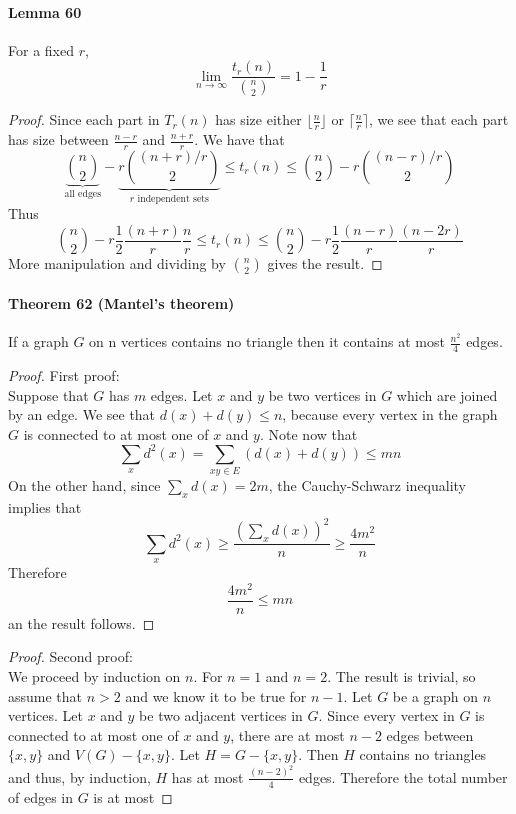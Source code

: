 \paragraph{Lemma 60} For a fixed $ r $, 
$$ \lim_{n\to\infty} \frac{t_r(n)}{\binom{n}{2}} = 1 - \frac{1}{r}$$
\begin{proof}
    Since each part in $ T_r(n) $ has size either $\lfloor\frac{n}{r}\rfloor$
    or $\lceil\frac{n}{r}\rceil$, we see that each part has size between
    $ \frac{n-r}{r}$ and $ \frac{n+r}{r}$. We have that 
    $$ \underbrace{\binom{n}{2}}_{\text{all edges}} - 
    \underbrace{r \binom{(n+r)/r}{2}}_{r \text{ independent sets}} 
    \leq t_r(n) \leq \binom{n}{2} - r\binom{(n-r)/r}{2} $$
    Thus 
    $$ \binom{n}{2} - r \frac{1}{2}\frac{(n+r)}{r}\frac{n}{r}
    \leq t_r(n) \leq \binom{n}{2} - r \frac{1}{2}\frac{(n-r)}{r}\frac{(n-2r)}{r} 
    $$
    More manipulation and dividing by $ \binom{n}{2} $ gives the result.
\end{proof}

\paragraph{Theorem 62 (Mantel's theorem)} If a graph $ G $ on n vertices contains 
no triangle then it contains at most $ \frac{n^2}{4} $ edges.
\begin{proof} First proof: \\
    Suppose that $ G $ has $ m $ edges. Let $ x $ and $ y $ be two vertices 
    in $ G $ which are joined by an edge. We see that $ d(x) + d(y) \leq n $, because 
    every vertex in the graph $ G $ is connected to at most one of $ x $ and $ y $. 
    Note now that 
    $$ \sum_x d^2(x) = \sum_{xy\in E} (d(x) + d(y)) \leq mn $$
    On the other hand, since $ \sum_{x} d(x) = 2m$, the Cauchy-Schwarz 
    inequality implies that 
    $$ \sum_x d^2(x) \geq \frac{(\sum_x d(x))^2}{n} \geq \frac{4m^2}{n} $$
    Therefore
    $$ \frac{4m^2}{n} \leq mn $$ 
    an the result follows.
\end{proof}
\begin{proof} Second proof: \\
    We proceed by induction on $ n $. For $ n = 1 $ and $ n = 2$. The result 
    is trivial, so assume that $ n > 2 $ and we know it to be true for $ n - 1$.
    Let $ G $ be a graph on $ n $ vertices. Let $ x $ and $ y $ be two adjacent vertices
    in $ G $. Since every vertex in $ G $ is connected to at most one of $ x $ and $ y$, 
    there are at most $ n - 2 $ edges between $ \{x,y\} $ and $ V(G) - \{x,y\} $. 
    Let $ H = G - \{x,y\}$. Then $ H $ contains no triangles and thus, by induction, 
    $ H $ has at most $ \frac{(n - 2)^2}{4} $ edges. Therefore the total number 
    of edges in $ G $ is at most

\end{proof}

